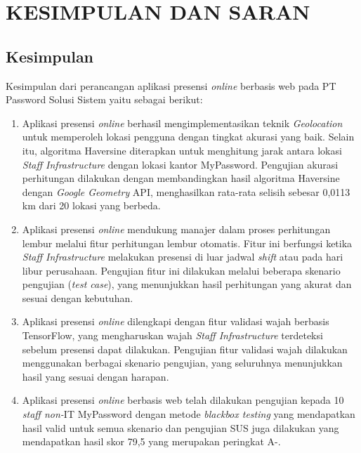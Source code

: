 \chapter{KESIMPULAN DAN SARAN}

\section{Kesimpulan}
Kesimpulan dari perancangan aplikasi presensi \textit{online} berbasis web pada PT Password Solusi Sistem yaitu sebagai berikut:
\begin{enumerate}
    \item Aplikasi presensi \textit{online} berhasil mengimplementasikan teknik \textit{Geolocation} untuk memperoleh lokasi pengguna dengan tingkat akurasi yang baik. Selain itu, algoritma Haversine diterapkan untuk menghitung jarak antara lokasi \textit{Staff Infrastructure} dengan lokasi kantor MyPassword. Pengujian akurasi perhitungan dilakukan dengan membandingkan hasil algoritma Haversine dengan \textit{Google Geometry} API, menghasilkan rata-rata selisih sebesar 0,0113 km dari 20 lokasi yang berbeda.
    \item Aplikasi presensi \textit{online} mendukung manajer dalam proses perhitungan lembur melalui fitur perhitungan lembur otomatis. Fitur ini berfungsi ketika \textit{Staff Infrastructure} melakukan presensi di luar jadwal \textit{shift} atau pada hari libur perusahaan. Pengujian fitur ini dilakukan melalui beberapa skenario pengujian (\textit{test case}), yang menunjukkan hasil perhitungan yang akurat dan sesuai dengan kebutuhan.
    \item Aplikasi presensi \textit{online} dilengkapi dengan fitur validasi wajah berbasis TensorFlow, yang mengharuskan wajah \textit{Staff Infrastructure} terdeteksi sebelum presensi dapat dilakukan. Pengujian fitur validasi wajah dilakukan menggunakan berbagai skenario pengujian, yang seluruhnya menunjukkan hasil yang sesuai dengan harapan.
    \item Aplikasi presensi \textit{online} berbasis web telah dilakukan pengujian kepada 10 \textit{staff non-}IT MyPassword dengan metode \textit{blackbox testing} yang mendapatkan hasil valid untuk semua skenario dan pengujian SUS juga dilakukan yang mendapatkan hasil skor 79,5 yang merupakan peringkat A-.
    
\end{enumerate}


